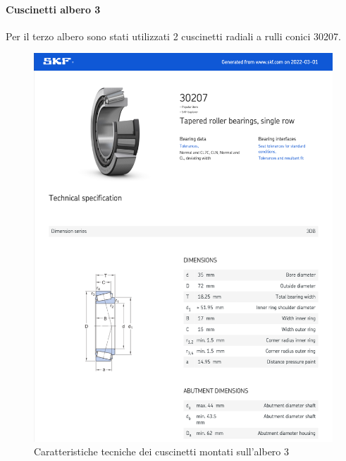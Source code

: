 \paragraph{Cuscinetti albero 3 }
Per il terzo albero sono stati utilizzati 2 cuscinetti radiali a rulli conici 30207. 
\newpage
\begin{figure}[h]
    \centering
    \includegraphics[scale=0.6]{Immagini/Cuscinetti1Albero3.png}
    \caption{Caratteristiche tecniche dei cuscinetti montati sull'albero 3}
    \label{fig:Cuscinetto1Albero3}
\end{figure}
\newpage
